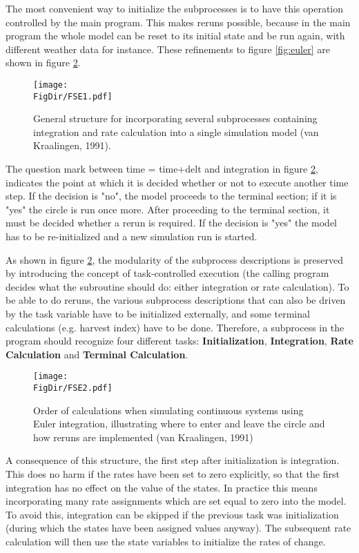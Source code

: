 The most convenient way to initialize the subprocesses is to have this operation controlled
by the main program. This makes reruns possible, because in the main  program the
whole model can be reset to its initial state and be run again, with different weather data
for instance. These refinements to figure \ref{fig:euler} are shown in figure \ref{fig:fse_order}.

\begin{figure}[p]
\centering
\texttt{[image: \\FigDir/FSE1.pdf]}
\caption{General structure for incorporating several subprocesses 
containing integration and rate calculation into a single simulation model (van Kraalingen,
1991).}
\label{fig:fse_struct}
\end{figure}

The question mark between time = time+delt and integration in figure \ref{fig:fse_order}, indicates the
point at which it is decided whether or not to execute another time step. If the decision is
"no", the model proceeds to the terminal section; if it is "yes" the circle is run once
more. After proceeding to the terminal section, it must be decided whether a rerun is
required. If the decision is "yes" the model has to be re-initialized and a new simulation
run is started.

As shown in figure \ref{fig:fse_order}, the modularity of the subprocess descriptions is preserved by
introducing the concept of task-controlled execution (the calling program decides what the
subroutine should do: either integration or rate calculation). To be able to do reruns, the
various subprocess descriptions that can also be driven by the task variable have to be
initialized externally, and some terminal calculations (e.g. harvest index) have to be done.
Therefore, a subprocess in the program should recognize four different tasks: {\bf Initialization}, 
{\bf Integration}, {\bf Rate Calculation} and {\bf Terminal Calculation}.

\begin{figure}[p]
\centering
\texttt{[image: \\FigDir/FSE2.pdf]}
\caption{Order of calculations when simulating continuous systems using Euler
integration, illustrating where to enter and leave the circle and how reruns
are implemented (van Kraalingen, 1991)}
\label{fig:fse_order}
\end{figure}

A consequence of this structure, the first step after initialization is integration. This does
no harm if the rates have been set to zero explicitly, so that the first integration has no
effect on the value of the states. In practice this means incorporating many rate assignments 
which are set equal to zero into the model. To avoid this, integration can be
skipped if the previous task was initialization (during which the states have been assigned
values anyway). The subsequent rate calculation will then use the state variables to
initialize the rates of change.

